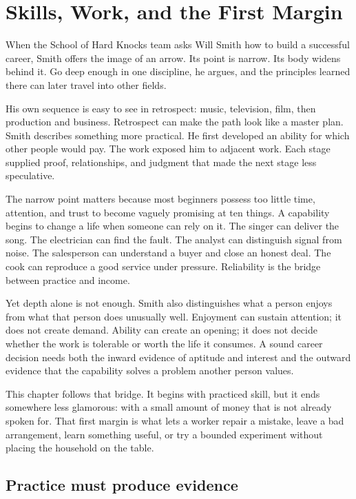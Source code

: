 \chapter{Skills, Work, and the First Margin}

When the School of Hard Knocks team asks Will Smith how to build a successful
career, Smith offers the image of an arrow. Its point is narrow. Its body
widens behind it. Go deep enough in one discipline, he argues, and the
principles learned there can later travel into other fields.

His own sequence is easy to see in retrospect: music, television, film, then
production and business. Retrospect can make the path look like a master plan.
Smith describes something more practical. He first developed an ability for
which other people would pay. The work exposed him to adjacent work. Each
stage supplied proof, relationships, and judgment that made the next stage
less speculative.

The narrow point matters because most beginners possess too little time,
attention, and trust to become vaguely promising at ten things. A capability
begins to change a life when someone can rely on it. The singer can deliver the
song. The electrician can find the fault. The analyst can distinguish signal
from noise. The salesperson can understand a buyer and close an honest deal.
The cook can reproduce a good service under pressure. Reliability is the
bridge between practice and income.

Yet depth alone is not enough. Smith also distinguishes what a person enjoys
from what that person does unusually well. Enjoyment can sustain attention; it
does not create demand. Ability can create an opening; it does not decide
whether the work is tolerable or worth the life it consumes. A sound career
decision needs both the inward evidence of aptitude and interest and the
outward evidence that the capability solves a problem another person values.

This chapter follows that bridge. It begins with practiced skill, but it ends
somewhere less glamorous: with a small amount of money that is not already
spoken for. That first margin is what lets a worker repair a mistake, leave a
bad arrangement, learn something useful, or try a bounded experiment without
placing the household on the table.

\section{Practice must produce evidence}

